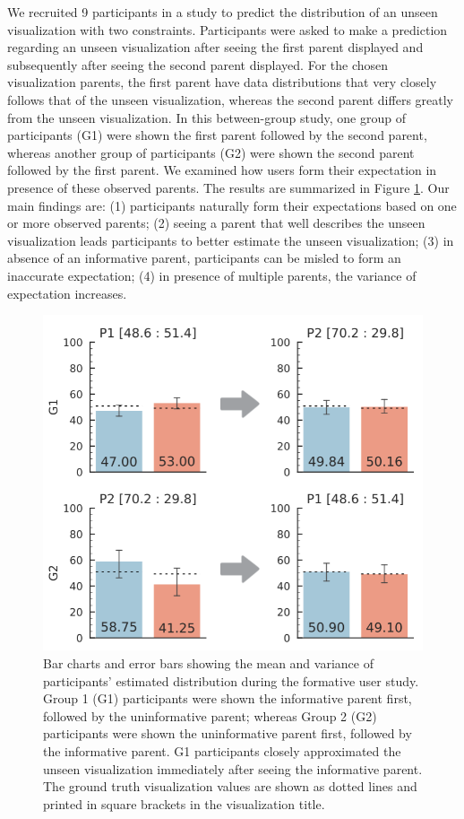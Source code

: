 We recruited 9 participants in a study to predict the distribution of an unseen visualization with two constraints. Participants were asked to make a prediction regarding an unseen visualization after seeing the first parent displayed and subsequently after seeing the second parent displayed. For the chosen visualization parents, the first parent have data distributions that very closely follows that of the unseen visualization, whereas the second parent differs greatly from the unseen visualization. In this between-group study, one group of participants (G1) were shown the first parent followed by the second parent, whereas another group of participants (G2) were shown the second parent followed by the first parent. We examined how users form their expectation in presence of these observed parents. The results are summarized in Figure \ref{fig:formative_study}. Our main findings are: (1) participants naturally form their expectations based on one or more observed parents; (2) seeing a parent that well describes the unseen visualization leads participants to better estimate the unseen visualization; (3) in absence of an informative parent, participants can be misled to form an inaccurate expectation; (4) in presence of multiple parents, the variance of expectation increases.
\begin{figure}[h!]
\centering
\includegraphics[width=\linewidth]{figures/Formative_Study.png}
\caption{Bar charts and error bars showing the mean and variance of participants' estimated distribution during the formative user study. Group 1 (G1) participants were shown the informative parent first, followed by the uninformative parent; whereas Group 2 (G2) participants were shown the uninformative parent first, followed by the informative parent. G1 participants closely approximated the unseen visualization immediately after seeing the informative parent. The ground truth visualization values are shown as dotted lines and printed in square brackets in the visualization title.}
\label{fig:formative_study}
\end{figure}

